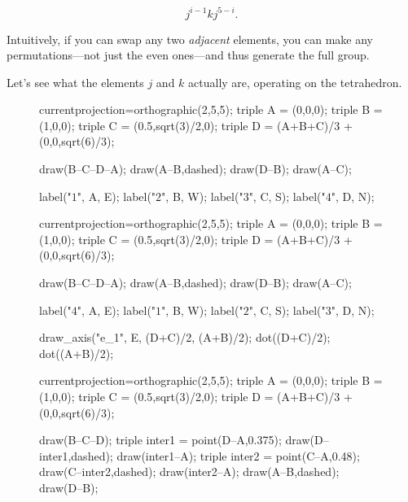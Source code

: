 \documentclass[../key.tex]{subfiles}
\begin{document}
$$j^{i-1}kj^{5-i}.$$

\noindent Intuitively, if you can swap any two \textit{adjacent} elements, you can make any permutations---not just the even ones---and thus generate the full group.

Let's see what the elements $j$ and $k$ actually are, operating on the tetrahedron.

\begin{figure}[h]
	\begin{center}
		\begin{minipage}{0.3\textwidth}
			\centering
			\begin{asy}[width=0.9\textwidth]
			currentprojection=orthographic(2,5,5);
			triple A = (0,0,0);
			triple B = (1,0,0);
			triple C = (0.5,sqrt(3)/2,0);
			triple D = (A+B+C)/3 + (0,0,sqrt(6)/3);
			
			draw(B--C--D--A);
			draw(A--B,dashed);
			draw(D--B);
			draw(A--C);
			
			label("$1$", A, E);
			label("$2$", B, W);
			label("$3$", C, S);
			label("$4$", D, N);
			\end{asy}
		\end{minipage}
		\hfill
		\begin{minipage}{0.3\textwidth}
			\centering
			\begin{asy}[width=0.9\textwidth]
			currentprojection=orthographic(2,5,5);
			triple A = (0,0,0);
			triple B = (1,0,0);
			triple C = (0.5,sqrt(3)/2,0);
			triple D = (A+B+C)/3 + (0,0,sqrt(6)/3);
			
			draw(B--C--D--A);
			draw(A--B,dashed);
			draw(D--B);
			draw(A--C);
			
			label("$4$", A, E);
			label("$1$", B, W);
			label("$2$", C, S);
			label("$3$", D, N);
			
			draw_axis("e_1", E, (D+C)/2, (A+B)/2);
			dot((D+C)/2);
			dot((A+B)/2);
			\end{asy}
		\end{minipage}
		\hfill
		\begin{minipage}{0.3\textwidth}
			\centering
			\begin{asy}[width=0.9\textwidth]
			currentprojection=orthographic(2,5,5);
			triple A = (0,0,0);
			triple B = (1,0,0);
			triple C = (0.5,sqrt(3)/2,0);
			triple D = (A+B+C)/3 + (0,0,sqrt(6)/3);
			
			draw(B--C--D);
			triple inter1 = point(D--A,0.375);
			draw(D--inter1,dashed);
			draw(inter1--A);
			triple inter2 = point(C--A,0.48);
			draw(C--inter2,dashed);
			draw(inter2--A);
			draw(A--B,dashed);
			draw(D--B);
			

\end{asy}
\end{minipage}
\end{center}
\end{figure}
\end{document}
